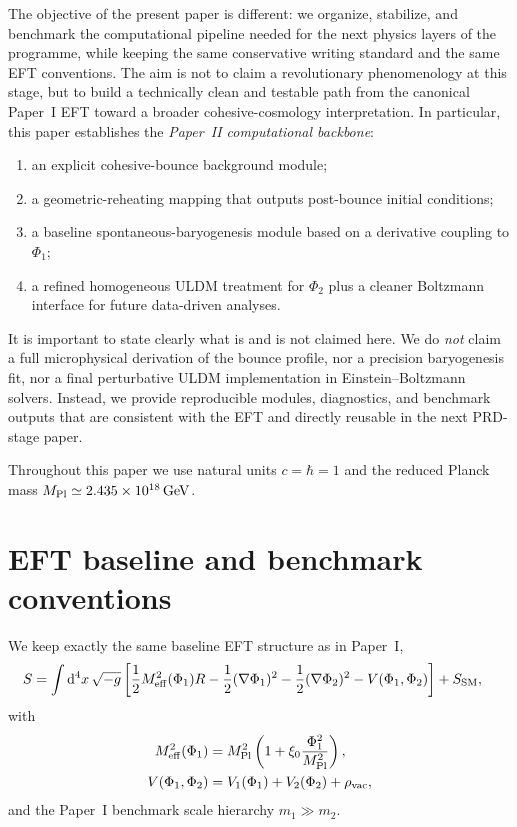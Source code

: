 \documentclass[aps,prd,onecolumn,nofootinbib,superscriptaddress]{revtex4-2}
\newcommand{\Mpl}{M_{\rm Pl}}
\newcommand{\Meff}{M_{\rm eff}}
\newcommand{\dd}{\mathrm{d}}
\newcommand{\trm}{\mathrm}
\begin{document}
The objective of the present paper is different: we organize, stabilize, and benchmark the computational pipeline needed for the next physics layers of the programme, while keeping the same conservative writing standard and the same EFT conventions.
The aim is not to claim a revolutionary phenomenology at this stage, but to build a technically clean and testable path from the canonical Paper~I EFT toward a broader cohesive-cosmology interpretation.
In particular, this paper establishes the \emph{Paper~II computational backbone}:
\begin{enumerate}[label=(\roman*),leftmargin=1.5em]
  \item an explicit cohesive-bounce background module;
  \item a geometric-reheating mapping that outputs post-bounce initial conditions;
  \item a baseline spontaneous-baryogenesis module based on a derivative coupling to $\Phi_1$;
  \item a refined homogeneous ULDM treatment for $\Phi_2$ plus a cleaner Boltzmann interface for future data-driven analyses.
\end{enumerate}

It is important to state clearly what is and is not claimed here.
We do \emph{not} claim a full microphysical derivation of the bounce profile, nor a precision baryogenesis fit, nor a final perturbative ULDM implementation in Einstein--Boltzmann solvers.
Instead, we provide reproducible modules, diagnostics, and benchmark outputs that are consistent with the EFT and directly reusable in the next PRD-stage paper.

Throughout this paper we use natural units $c=\hbar=1$ and the reduced Planck mass $\Mpl\simeq 2.435\times10^{18}\,\trm{GeV}$.

\section{EFT baseline and benchmark conventions}
\label{sec:eft-baseline}

We keep exactly the same baseline EFT structure as in Paper~I,
\begin{align}
S &= \int \dd^4x\,\sqrt{-g}
\left[
\frac{1}{2}\Meff^2(\Phi_1)R
-\frac12(\nabla\Phi_1)^2
-\frac12(\nabla\Phi_2)^2
-V(\Phi_1,\Phi_2)
\right]
+S_{\rm SM},
\end{align}
with
\begin{align}
\Meff^2(\Phi_1)&=\Mpl^2\left(1+\xi_0\frac{\Phi_1^2}{\Mpl^2}\right),
\\
V(\Phi_1,\Phi_2)&=V_1(\Phi_1)+V_2(\Phi_2)+\rho_{\rm vac},
\end{align}
and the Paper~I benchmark scale hierarchy $m_1\gg m_2$.
\end{document}
